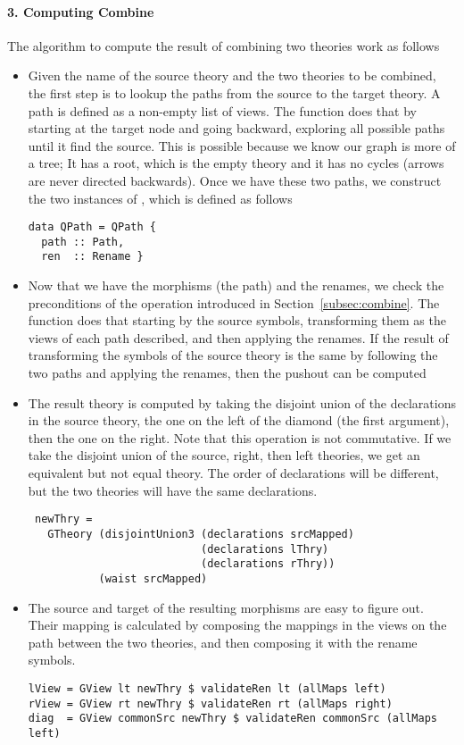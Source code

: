 \paragraph{3. Computing Combine}
The algorithm to compute the result of combining two theories work as follows 
\begin{itemize}
    \item Given the name of the source theory and the two theories to be combined, the first step is to lookup the paths from the source to the target theory. A path is defined as a non-empty list of views. The function  does that by starting at the target node and going backward, exploring all possible paths until it find the source. This is possible because we know our graph is more of a tree; It has a root, which is the empty theory and it has no cycles (arrows are never directed backwards). Once we have these two paths, we construct the two instances of , which is defined as follows 
\begin{verbatim}
data QPath = QPath { 
  path :: Path,
  ren  :: Rename }
\end{verbatim}

    \item Now that we have the morphisms (the path) and the renames, we check the preconditions of the operation introduced in Section~\ref{subsec:combine}. The function  does that starting by the source symbols, transforming them as the views of each path described, and then applying the renames. If the result of transforming the symbols of the source theory is the same by following the two paths and applying the renames, then the pushout can be computed 
    
    \item The result theory is computed by taking the disjoint union of the declarations in the source theory, the one on the left of the diamond (the first argument), then the one on the right. Note that this operation is not commutative. If we take the disjoint union of the source, right, then left theories, we get an equivalent but not equal theory. The order of declarations will be different, but the two theories will have the same declarations. 
\begin{verbatim}
 newThry = 
   GTheory (disjointUnion3 (declarations srcMapped)
                           (declarations lThry) 
                           (declarations rThry)) 
           (waist srcMapped)
\end{verbatim}    
    \item The source and target of the resulting morphisms are easy to figure out. Their mapping is calculated by composing the mappings in the views on the path between the two theories, and then composing it with the rename symbols. 
\begin{verbatim}
lView = GView lt newThry $ validateRen lt (allMaps left)
rView = GView rt newThry $ validateRen rt (allMaps right)
diag  = GView commonSrc newThry $ validateRen commonSrc (allMaps left)
\end{verbatim}
\end{itemize}

